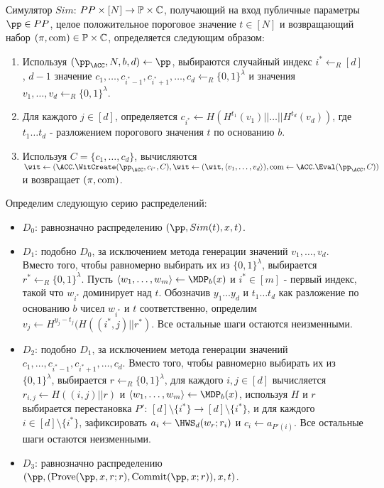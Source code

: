 \begin{definition}[Симулятор]
	Симулятор $Sim$: $PP \times [N] \rightarrow \mathbb{P} \times \mathbb{C}$, получающий на вход публичные параметры $\pp \in PP$, целое положительное пороговое значение $t \in [N]$ и возвращающий набор $(\pi, \text{com}) \in \mathbb{P} \times \mathbb{C}$, определяется следующим образом:
	\begin{enumerate}
		\item Используя $(\pp_\ACC, N, b, d) \leftarrow \pp$, выбираются случайный индекс $i^* \leftarrow_R [d]$, $d - 1$ значение $c_1, \dots, c_{i^* - 1}, c_{i^* + 1}, \dots, c_d \leftarrow_R \{0, 1\}^\lambda$ и значения $v_1, \dots, v_d \leftarrow_R \{0, 1\}^\lambda$.
		\item Для каждого $j \in [d]$, определяется $c_{i^*} \leftarrow H(H^{t_1}(v_1) || \dots || H^{t_d}(v_d))$, где $t_1 \dots t_d$ - разложением порогового значения $t$ по основанию $b$.
		\item Используя $C = \{c_1, \dots, c_d\}$, вычисляются $\wit \leftarrow (\ACC.\WitCreate(\pp_\ACC, c_{i^*}, C), \wit \leftarrow (\wit, \langle v_1, \dots, v_d \rangle), \com \leftarrow \ACC.\Eval(\pp_\ACC, C))$ и возвращает $(\pi, \text{com})$.
	\end{enumerate}
\end{definition}

\begin{definition}[Распределения $D_0$, $D_1$, $D_2$ и $D_3$]
	Определим следующую серию распределений:
	\begin{itemize}
		\item $D_0$: равнозначно распределению $(\pp, Sim(t), x, t)$.
		\item $D_1$: подобно $D_0$, за исключением метода генерации значений $v_1, \dots, v_d$. Вместо того, чтобы равномерно выбирать их из $\{0, 1\}^\lambda$, выбирается $r^* \leftarrow_R \{0, 1\}^\lambda$. Пусть $\langle w_1, \dots, w_m \rangle \leftarrow \MDP_b(x)$ и $i^* \in [m]$ - первый индекс, такой что $w_{i^*}$ доминирует над $t$. Обозначив $y_1 \dots y_d$ и $t_1 \dots t_d$ как разложение по основанию $b$ чисел $w_{i^*}$ и $t$ соответственно, определим $v_j \leftarrow H^{y_j - t_j}(H((i^*, j) || r^*)$. Все остальные шаги остаются неизменными.
		\item $D_2$: подобно $D_1$, за исключением метода генерации значений $c_1, \dots, c_{i^* - 1}, c_{i^* + 1}, \dots, c_d$. Вместо того, чтобы равномерно выбирать их из $\{0, 1\}^\lambda$, выбирается $r \leftarrow_R \{0, 1\}^\lambda$, для каждого $i, j \in [d]$ вычисляется $r_{i, j} \leftarrow H((i, j) || r)$ и $\langle w_1, \dots, w_m \rangle \leftarrow \MDP_b(x)$, используя $H$ и $r$ выбирается перестановка $P'$: $[d] \setminus \{i^*\} \rightarrow [d] \setminus \{i^*\}$, и для каждого $i \in [d] \setminus \{i^*\}$, зафиксировать $a_i \leftarrow \HWS_d(w_r; r_i)$ и $c_i \leftarrow a_{P'(i)}$. Все остальные шаги остаются неизменными.
		\item $D_3$: равнозначно распределению $(\pp, (\Prove(\pp, x, r; r), \Commit(\pp, x; r)), x, t)$.
	\end{itemize}
\end{definition}

